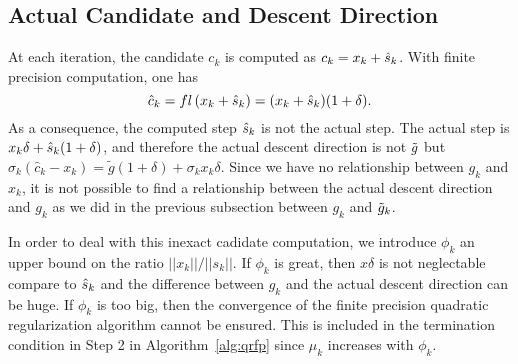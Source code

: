 \documentclass{article}[12pt]
\begin{document}
	\subsection{Actual Candidate and Descent Direction}
		At each iteration, the candidate $c_k$ is computed as $c_k = x_k + \hat{s}_{k}$. With finite precision computation, one has 
		\begin{equation}
			\hat{c}_k = fl\left(x_k+\hat{s}_{k}\right) = (x_k+\hat{s}_{k})(1+\delta).
		\end{equation}
		As a consequence, the computed step $\hat{s}_{k}$ is  not the actual step. The actual step is $  x_k\delta + \hat{s}_{k}(1+\delta)$, and therefore the actual descent direction is not $\tilde{g}$ but $\sigma_k(\hat{c}_k - x_k) = \tilde{g}(1+\delta) +\sigma_k x_k\delta$. Since we have no relationship between $g_k$ and $x_k$, it is not possible to find a relationship between the actual descent direction and $g_k$ as we did in the previous subsection between $g_k$ and $\tilde{g}_k$.
		
		In order to deal with this inexact cadidate computation, we introduce $\phi_k$ an upper bound on the ratio $||x_k||/||s_k||$. If $\phi_k$ is great, then $ x \delta$ is not neglectable compare to $\hat{s}_{k}$ and the difference between $g_k$ and the actual descent direction can be huge. If $\phi_k$ is too big, then the convergence of the finite precision quadratic regularization algorithm cannot be ensured. This is included in the termination condition in Step 2 in Algorithm~\ref{alg:qrfp} since $\mu_k$ increases with $\phi_k$.
	
\end{document}

